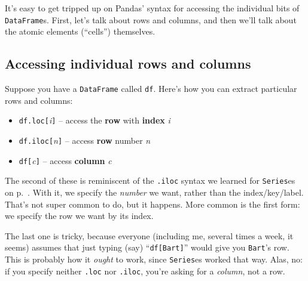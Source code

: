 
\chapter[Tables in Python (2 of 3)]{\huge\selectfont{Tables in Python (2 of
3)}}

\label{tablesInPython2}

It's easy to get tripped up on Pandas' syntax for accessing the individual bits
of \texttt{DataFrame}s. First, let's talk about rows and columns, and then
we'll talk about the atomic elements (``cells'') themselves.

\section{Accessing individual rows and columns}

\label{accessIndividualRowsColsOfDataFrame}

Suppose you have a \texttt{DataFrame} called \texttt{df}. Here's how you can
extract particular rows and columns:

\begin{itemize}[nosep]
\item \texttt{df.loc[}\textsl{i}\texttt{]} -- access the \textbf{row} with
\textbf{index} \textsl{i}
\item \texttt{df.iloc[}\textsl{n}\texttt{]} -- access \textbf{row} number
\textsl{n}
\item \texttt{df[}\textsl{c}\texttt{]} -- access \textbf{column} \textsl{c}
\end{itemize}


The second of these is reminiscent of the \texttt{.iloc} syntax we learned for
\texttt{Series}es on p.~\pageref{iloc}. With it, we specify the \textit{number}
we want, rather than the index/key/label. That's not super common to do, but it
happens. More common is the first form: we specify the row we want by its
index.

The last one is tricky, because everyone (including me, several times a week,
it seems) assumes that just typing (say) ``\texttt{df[\textquotesingle{}Bart\textquotesingle{}]}'' would give you
\texttt{Bart}'s row. This is probably how it \textit{ought} to work, since
\texttt{Series}es worked that way. Alas, no: if you specify neither
\texttt{.loc} nor \texttt{.iloc}, you're asking for a \textit{column}, not a
row.


